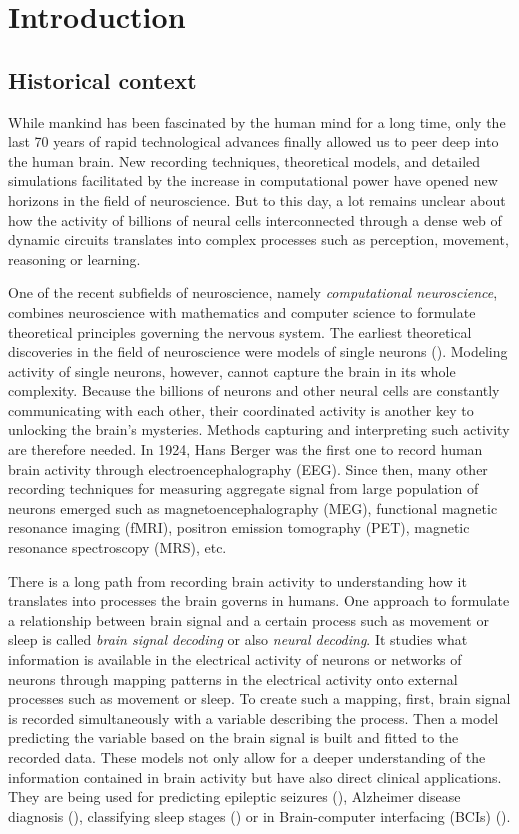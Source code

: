
\chapter{Introduction}
\label{chap:intr}

\section*{Historical context}
While mankind has been fascinated by the human mind for a long time, only the last 70 years of rapid technological advances finally allowed us to peer deep into the human brain.
New recording techniques, theoretical models, and detailed simulations facilitated by the increase in computational power have opened new horizons in the field of neuroscience.
But to this day, a lot remains unclear about how the activity of billions of neural cells interconnected through a dense web of dynamic circuits translates into complex processes such as perception, movement, reasoning or learning.  

One of the recent subfields of neuroscience, namely \textit{computational neuroscience}, combines neuroscience with mathematics and computer science to formulate theoretical principles governing the nervous system. 
The earliest theoretical discoveries in the field of neuroscience were models of single neurons (\cite{lapique-1907, hodgkin1952quantitative}).
Modeling activity of single neurons, however, cannot capture the brain in its whole complexity.
Because the billions of neurons and other neural cells are constantly communicating with each other, their coordinated activity is another key to unlocking the brain’s mysteries.
Methods capturing and interpreting such activity are therefore needed.
In 1924, Hans Berger was the first one to record human brain activity through electroencephalography (EEG).
Since then, many other recording techniques for measuring aggregate signal from large population of neurons emerged such as magnetoencephalography (MEG), functional magnetic resonance imaging (fMRI), positron emission tomography (PET), magnetic resonance spectroscopy (MRS), etc.  

There is a long path from recording brain activity to understanding how it translates into processes the brain governs in humans.
One approach to formulate a relationship between brain signal and a certain process such as movement or sleep is called \textit{brain signal decoding} or also \textit{neural decoding}.
It studies what information is available in the electrical activity of neurons or networks of neurons through mapping patterns in the electrical activity onto external processes such as movement or sleep.
To create such a mapping, first, brain signal is recorded simultaneously with a variable describing the process. 
Then a model predicting the variable based on the brain signal is built and fitted to the recorded data.
These models not only allow for a deeper understanding of the information contained in brain activity but have also direct clinical applications.
They are being used for predicting epileptic seizures (\cite{epileptic-seizures-eeg}), Alzheimer disease diagnosis (\cite{alzheimer-eeg}), classifying sleep stages (\cite{sleep-stage-alg-comparison}) or in Brain-computer interfacing (BCIs) (\cite{ecog-bci, eeg-bci}).

